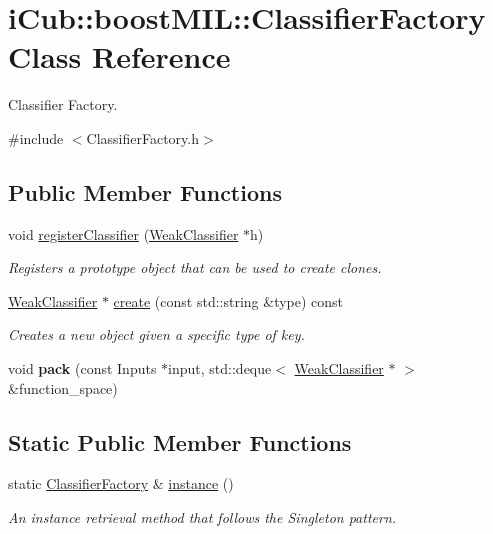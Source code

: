 \section{i\+Cub\+:\+:boost\+M\+I\+L\+:\+:Classifier\+Factory Class Reference}
\label{classiCub_1_1boostMIL_1_1ClassifierFactory}


Classifier Factory.  




{\ttfamily \#include $<$Classifier\+Factory.\+h$>$}

\subsection*{Public Member Functions}
\begin{DoxyCompactItemize}
\item 
void \hyperlink{classiCub_1_1boostMIL_1_1ClassifierFactory_ad1ef37e6ca57c3c04ebf69c170d864ac}{register\+Classifier} (\hyperlink{classiCub_1_1boostMIL_1_1WeakClassifier}{Weak\+Classifier} $\ast$h)
\begin{DoxyCompactList}\small\item\em Registers a prototype object that can be used to create clones. \end{DoxyCompactList}\item 
\hyperlink{classiCub_1_1boostMIL_1_1WeakClassifier}{Weak\+Classifier} $\ast$ \hyperlink{classiCub_1_1boostMIL_1_1ClassifierFactory_a995c41f25cf812e19a9dfbf9150fcb54}{create} (const std\+::string \&type) const 
\begin{DoxyCompactList}\small\item\em Creates a new object given a specific type of key. \end{DoxyCompactList}\item 
void {\bfseries pack} (const Inputs $\ast$input, std\+::deque$<$ \hyperlink{classiCub_1_1boostMIL_1_1WeakClassifier}{Weak\+Classifier} $\ast$ $>$ \&function\+\_\+space)\label{classiCub_1_1boostMIL_1_1ClassifierFactory_a2e2c8bd88e304ad5e83f2f56fa622cfb}

\end{DoxyCompactItemize}
\subsection*{Static Public Member Functions}
\begin{DoxyCompactItemize}
\item 
static \hyperlink{classiCub_1_1boostMIL_1_1ClassifierFactory}{Classifier\+Factory} \& \hyperlink{classiCub_1_1boostMIL_1_1ClassifierFactory_aaae3074fda41925b058b2865a0b9b054}{instance} ()
\begin{DoxyCompactList}\small\item\em An instance retrieval method that follows the Singleton pattern. \end{DoxyCompactList}\end{DoxyCompactItemize}
